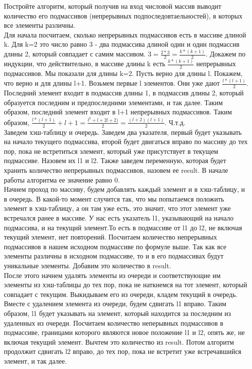 \documentclass[12pt]{extreport}
\theoremstyle{definiton}
\theoremstyle{definition}
\theoremstyle{definition}
\begin{document}
	 \Pr[5] Постройте алгоритм, который получив на вход числовой массив выводит количество его подмассивов (непрерывных подпоследовтаельностей), в которых все элементы различны.
	 \newline
	 \\ Для начала посчитаем, сколько непрерывных подмассивов есть в массиве длиной k. Для k=2 это число равно 3 - два подмассива длиной один и один подмассив длины 2, который совпадает с самим массивом. $3 = \frac{2*3}{2} = \frac{k*(k+1)}{2}$. Докажем по индукции, что действительно, в массиве длины k есть $\frac{k*(k+1)}{2}$ непрерывных подмассивов. Мы показали для длины k=2. Пусть верно для длины l. Покажем, что верно и для длины l+1. Возьмем первые l элементов. Они уже дают $\frac{l*(l+1)}{2}$. Последний элемент входит в подмассив длины 1, в подмассив длины 2, который образуется последним и предпоследними элементами, и так далее. Таким образом, последний элемент входит в l+1 непрерывных подмассивов. Таким образом, $\frac{l*(l+1)}{2} + l + 1 = \frac{l^2+l + 2l + 2)}{2} = \frac{(l+2)(l+1)}{2}$. Ч.т.д.
	 \\ Заведем хэш-таблицу и очередь. Заведем два указателя, первый будет указывать на начало текущего подмассива, второй будет двигаться вправо по массиву до тех пор, пока не встретиться элемент, который уже присутствует в текущем подмассиве. Назовем их l1 и l2. Также заведем переменную, которая будет хранить количество непрерывных подмассивов, назовем ее result. В начале работы алгоритма ее значение равно 0.
	 \\Начнем проход по массиву, будем добавлять каждый элемент и в хэш-таблицу, и в очередь. В какой-то момент случится так, что мы попытаемся положить элемент в хэш-таблицу, а он там уже есть, это значит, что этот элемент уже встречался ранее в массиве. У нас есть указатель l1, указывающий на начало подмассива, и на текущий элемент.То есть в подмассиве от l1 до l2, не включая текущий элемент, нет повторений. Посчитаем количество непрерывных подмассивов в нашем исходном подмассиве по формуле выше. Так как все элементы различны в исходном подмассиве, то и в его подмассивах будут уникальные элементы. Добавим это количество в result.
	 \\ После этого начнем удалять элементы из очереди и соответствующие им элементы из хэш-таблицы до тех пор, пока не наткнемся на тот элемент, который совпадает с текущим. Выкидываем его из очереди, кладем текущий в очередь. Вместе с удалением элемента из очереди, будем сдвигать l1 вправо. Таким образом, l1 будет указывать на элемент, который находится за последним из удаленных из очереди. Посчитаем количество неперывных подмассивов в подмассиве, границами которого являются новое положение l1 и l2, опять же, не включая текущий элемент. Вычтем это количество из result. Потом алгоритм продолжит сдвигать l2 вправо, до тех пор, пока не встретит уже встречавшийся элемент, и так далее.
\end{document}
